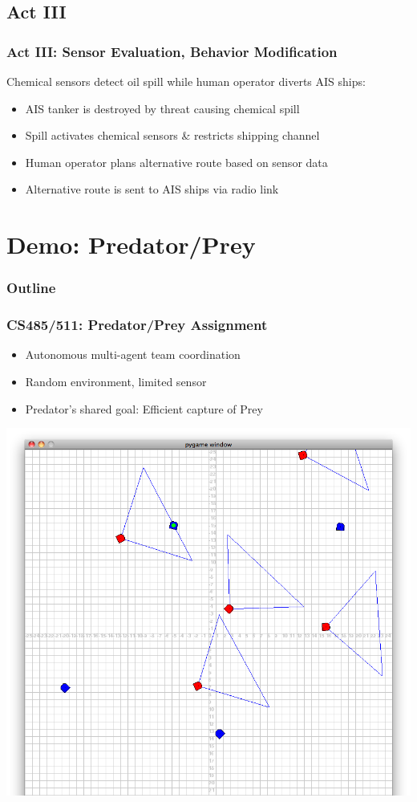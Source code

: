 \documentclass[mathserif,usenames,dvipsnames]{beamer}
\begin{document}
\subsection{Act III}
\frame
{
    \frametitle{Act III: Sensor Evaluation, Behavior Modification}
    Chemical sensors detect oil spill while human operator diverts AIS ships:
    \begin{itemize}
        \item AIS tanker is destroyed by threat causing chemical spill
        \item Spill activates chemical sensors \& restricts shipping channel
        \item Human operator plans alternative route based on sensor data
        \item Alternative route is sent to AIS ships via radio link
    \end{itemize}
}
\section{Demo: Predator/Prey}
\frame
{
    \frametitle{Outline}
    \tableofcontents
}

\frame
{
    \frametitle{CS485/511: Predator/Prey Assignment}
    \begin{itemize}
        \item Autonomous multi-agent team coordination
        \item Random environment, limited sensor
        \item Predator's shared goal: Efficient capture of Prey
    \end{itemize}
}
\frame
{
    \begin{center}
        \includegraphics[scale=.23]{images/pp.png}
    \end{center}
}
\end{document}
